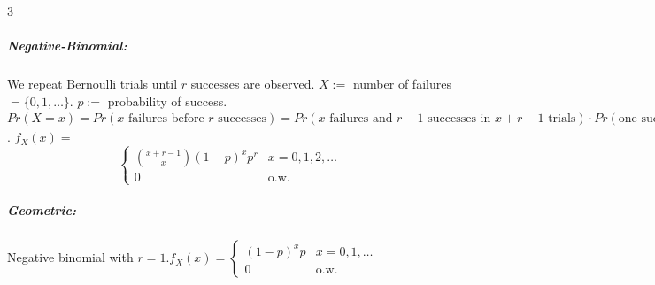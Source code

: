 \documentclass[landscape,10pt]{article}
\begin{document}
\begin{multicols}{3}
            \subparagraph*{Negative-Binomial: }
                    We repeat Bernoulli trials until $r$ successes are observed. $X :=$ number of failures $= \{0, 1, \ldots\}$. $p :=$ probability of success. $Pr(X = x) = Pr(x \text{ failures before $r$ successes}) = Pr(x \text{ failures and $r-1$ successes in $x + r - 1$ trials}) \cdot Pr(\text{one success in last trial}) = \left[{x+r-1 \choose x } (1-p)^x p^{r-1} \right] \cdot p = {x + r - 1 \choose x} (1 - p)^x p^r$. $f_X(x) = $ \[
                        \begin{cases}
                            {x+r-1 \choose x} (1-p)^x p^r   &   x=0,1,2,\ldots \\
                            0       & \text{o.w.}
                        \end{cases}
                    \]
            \subparagraph*{Geometric: }
                    Negative binomial with $r=1. f_X(x) = \begin{cases} (1-p)^x p & x=0,1,\ldots \\ 0 & \text{o.w.} \end{cases}$


\end{multicols}
\end{document}
